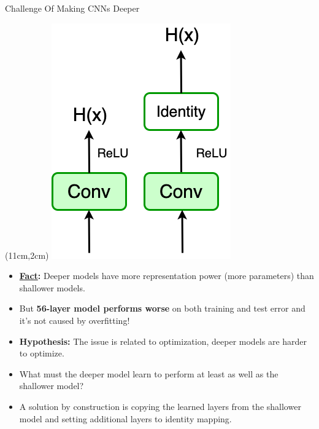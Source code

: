 \documentclass[serif, aspectratio=169]{beamer}
\begin{document}
\begin{frame}{Challenge Of Making CNNs Deeper}
	
	\begin{textblock*}{5cm}(11cm,2cm) %
		\includegraphics[keepaspectratio, scale=0.4]{pic/Identity}
	\end{textblock*}
	
	\begin{itemize}
		\item \textbf{\underline{Fact}:} Deeper models have more representation \newline power (more parameters) than shallower models.
		\item But \textbf{56-layer model performs worse} on both training \newline and test error and it’s not caused by overfitting!
		\item \textbf{Hypothesis:} The issue is related to optimization, \newline deeper models are harder to optimize.
		\item \color{red} What must the deeper model learn to perform \newline at least as well as the shallower model?
		\item A solution by construction is copying the learned \newline layers from the shallower model and setting additional \newline layers to identity mapping.
	\end{itemize}
\end{frame}
\end{document}
